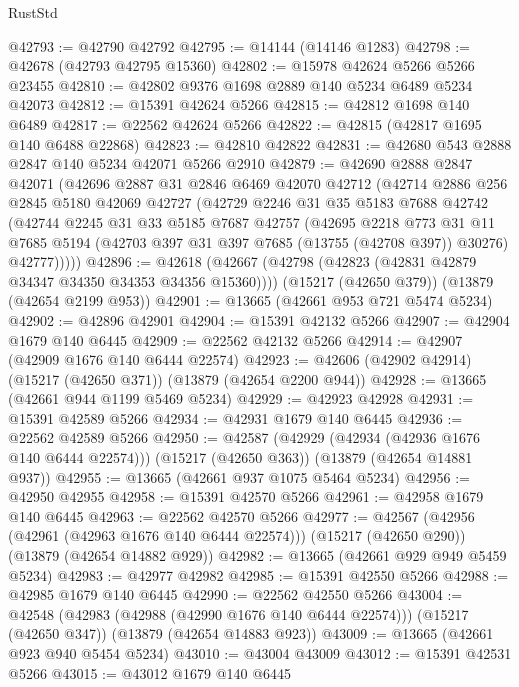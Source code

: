 \begin{lexlean}{RustStd}
\begin{coremodule}
@42793 := @42790 @42792
@42795 := @14144 (@14146 @1283)
@42798 := @42678 (@42793 @42795 @15360)
@42802 := @15978 @42624 @5266 @5266 @23455
@42810 := @42802 @9376 @1698 @2889 @140 @5234 @6489 @5234 @42073
@42812 := @15391 @42624 @5266
@42815 := @42812 @1698 @140 @6489
@42817 := @22562 @42624 @5266
@42822 := @42815 (@42817 @1695 @140 @6488 @22868)
@42823 := @42810 @42822
@42831 := @42680 @543 @2888 @2847 @140 @5234 @42071 @5266 @2910
@42879 := @42690
    @2888
    @2847
    @42071
    (@42696
      @2887
      @31
      @2846
      @6469
      @42070
      @42712
      (@42714
        @2886
        @256
        @2845
        @5180
        @42069
        @42727
        (@42729
          @2246
          @31
          @35
          @5183
          @7688
          @42742
          (@42744
            @2245
            @31
            @33
            @5185
            @7687
            @42757
            (@42695
              @2218
              @773
              @31
              @11
              @7685
              @5194
              (@42703 @397 @31 @397 @7685 (@13755 (@42708 @397)) @30276)
              @42777)))))
@42896 := @42618
    (@42667 (@42798 (@42823 (@42831 @42879 @34347 @34350 @34353 @34356 @15360))))
    (@15217 (@42650 @379))
    (@13879 (@42654 @2199 @953))
@42901 := @13665 (@42661 @953 @721 @5474 @5234)
@42902 := @42896 @42901
@42904 := @15391 @42132 @5266
@42907 := @42904 @1679 @140 @6445
@42909 := @22562 @42132 @5266
@42914 := @42907 (@42909 @1676 @140 @6444 @22574)
@42923 := @42606 (@42902 @42914) (@15217 (@42650 @371)) (@13879 (@42654 @2200 @944))
@42928 := @13665 (@42661 @944 @1199 @5469 @5234)
@42929 := @42923 @42928
@42931 := @15391 @42589 @5266
@42934 := @42931 @1679 @140 @6445
@42936 := @22562 @42589 @5266
@42950 := @42587
    (@42929 (@42934 (@42936 @1676 @140 @6444 @22574)))
    (@15217 (@42650 @363))
    (@13879 (@42654 @14881 @937))
@42955 := @13665 (@42661 @937 @1075 @5464 @5234)
@42956 := @42950 @42955
@42958 := @15391 @42570 @5266
@42961 := @42958 @1679 @140 @6445
@42963 := @22562 @42570 @5266
@42977 := @42567
    (@42956 (@42961 (@42963 @1676 @140 @6444 @22574)))
    (@15217 (@42650 @290))
    (@13879 (@42654 @14882 @929))
@42982 := @13665 (@42661 @929 @949 @5459 @5234)
@42983 := @42977 @42982
@42985 := @15391 @42550 @5266
@42988 := @42985 @1679 @140 @6445
@42990 := @22562 @42550 @5266
@43004 := @42548
    (@42983 (@42988 (@42990 @1676 @140 @6444 @22574)))
    (@15217 (@42650 @347))
    (@13879 (@42654 @14883 @923))
@43009 := @13665 (@42661 @923 @940 @5454 @5234)
@43010 := @43004 @43009
@43012 := @15391 @42531 @5266
@43015 := @43012 @1679 @140 @6445

\end{coremodule}
\end{lexlean}
